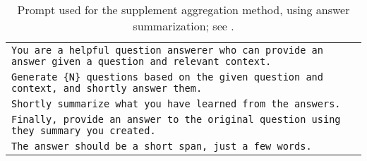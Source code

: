 \begin{table*}
    \caption{Prompt used for the \rephrase{} supplement aggregation method, using answer summarization; see .}
    \centering
    \small
    \begin{tabular}{>{\raggedright\arraybackslash\tt}p{}<{}}
      \toprule
      You are a helpful question answerer who can provide an answer given a question and relevant context. \\
      Generate \{N\} questions based on the given question and context, and shortly answer them. \\
      Shortly summarize what you have learned from the answers. \\
      Finally, provide an answer to the original question using they summary you created. \\
      The answer should be a short span, just a few words. \\
      \bottomrule
    \end{tabular}
    \label{tab:summary_prompt}
\end{table*}
